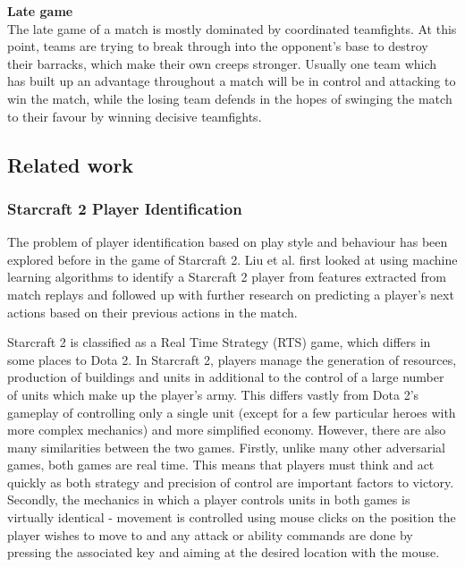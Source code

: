 \documentclass[Report.tex]{subfiles}
\begin{document}
\textbf{Late game} \\
The late game of a match is mostly dominated by coordinated teamfights. At this point, teams are trying to break through into the opponent's base to destroy their barracks, which make their own creeps stronger. Usually one team which has built up an advantage throughout a match will be in control and attacking to win the match, while the losing team defends in the hopes of swinging the match to their favour by winning decisive teamfights. 

\subsection{Related work}

\subsubsection{Starcraft 2 Player Identification}
The problem of player identification based on play style and behaviour has been explored before in the game of Starcraft 2. Liu et al. \cite{starcraft-identification} first looked at using machine learning algorithms to identify a Starcraft 2 player from features extracted from match replays and followed up with further research \cite{starcraft-actions} on predicting a player's next actions based on their previous actions in the match. 

Starcraft 2 is classified as a Real Time Strategy (RTS) game, which differs in some places to Dota 2. In Starcraft 2, players manage the generation of resources, production of buildings and units in additional to the control of a large number of units which make up the player's army. This differs vastly from Dota 2's gameplay of controlling only a single unit (except for a few particular heroes with more complex mechanics) and more simplified economy. However, there are also many similarities between the two games. Firstly, unlike many other adversarial games, both games are real time. This means that players must think and act quickly as both strategy and precision of control are important factors to victory. Secondly, the mechanics in which a player controls units in both games is virtually identical - movement is controlled using mouse clicks on the position the player wishes to move to and any attack or ability commands are done by pressing the associated key and aiming at the desired location with the mouse.
\end{document}
